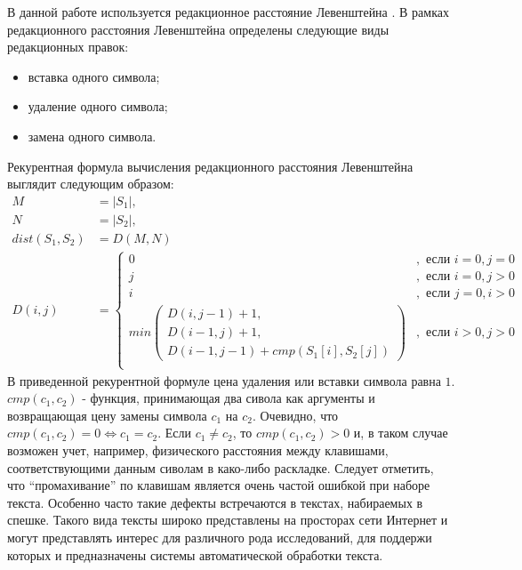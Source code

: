 В данной работе используется редакционное расстояние Левенштейна \cite{manning}. В рамках редакционного расстояния Левенштейна определены следующие виды редакционных правок:
\begin{itemize}
	\item
	вставка одного символа;
	\item
	удаление одного символа;
	\item
	замена одного символа.
\end{itemize}
Рекурентная формула вычисления редакционного расстояния Левенштейна выглядит следующим образом:
\begin{align*} 
	M &= |S_1|, \\
	N &= |S_2|, \\
	dist(S_1, S_2) &= D(M, N) \\
	D(i, j) &= 
	\begin{cases}
		0&,\text{ если } i = 0, j = 0 \\
		j&,\text{ если } i = 0, j > 0 \\
		i&,\text{ если } j = 0, i > 0 \\
		min(\substack{
			D(i, j - 1) + 1, \\
			D(i - 1, j) + 1, \\
			D(i - 1, j - 1) + cmp(S_1[i], S_2[j])
		})&,\text{ если } i > 0, j > 0 \\  
	\end{cases}
\end{align*}
В приведенной рекурентной формуле цена удаления или вставки символа равна \(1\). \(cmp(c_1, c_2)\) - функция, принимающая два сивола как аргументы и возвращающая цену замены символа \(c_1\) на \(c_2\). Очевидно, что \( cmp(c_1, c_2) = 0 \Leftrightarrow c_1 = c_2\). Если \(c_1 \neq c_2\), то \( cmp(c_1, c_2) > 0 \) и, в таком случае возможен учет, например, физического расстояния между клавишами, соответствующими данным сиволам в како-либо раскладке. Следует отметить, что ``промахивание'' по клавишам является очень частой ошибкой при наборе текста. Особенно часто такие дефекты встречаются в текстах, набираемых в спешке. Такого вида тексты широко представлены на просторах сети Интернет и могут представлять интерес для различного рода исследований, для поддержи которых и предназначены системы автоматической обработки текста.

